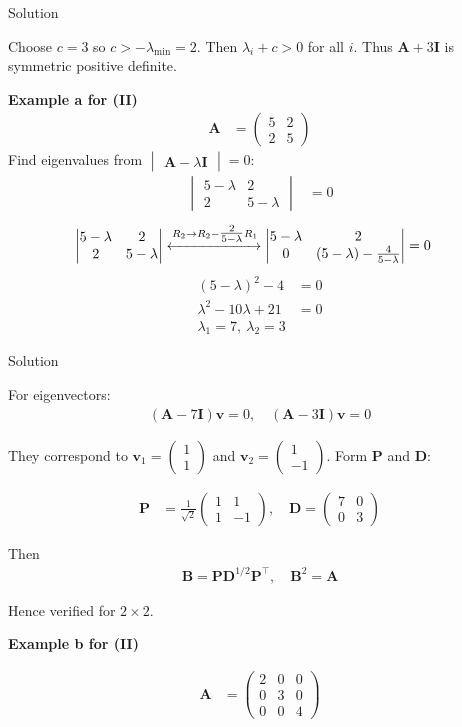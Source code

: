 \documentclass{beamer}
\numberwithin{equation}{section}
\theoremstyle{remark}
\newcommand{\myvec}[1]{\ensuremath{\begin{pmatrix}#1\end{pmatrix}}}
\newcommand{\mydet}[1]{\ensuremath{\begin{vmatrix}#1\end{vmatrix}}}
\let\vec\mathbf
\begin{document}
\begin{frame}{Solution}

Choose $c=3$ so $c>-\lambda_{\min}=2$.  
Then $\lambda_i+c>0$ for all $i$.  
Thus $\vec{A}+3\vec{I}$ is symmetric positive definite.

\textbf{Example a for (II)}
\begin{align}
\vec{A} &= \myvec{5 & 2\\2 & 5}
\end{align}
Find eigenvalues from $\mydet{\vec{A}-\lambda \vec{I}}=0$:
\begin{align}
\mydet{5-\lambda & 2\\2 & 5-\lambda} &= 0
\end{align}
\begin{align}
\mydet{5-\lambda & 2\\2 & 5-\lambda} 
\xleftrightarrow{R_2 \to R_2 - \tfrac{2}{5-\lambda}R_1}
\mydet{5-\lambda & 2\\0 & (5-\lambda)-\tfrac{4}{5-\lambda}} &= 0
\end{align}
\begin{align}
(5-\lambda)^2 - 4 &= 0\\
\lambda^2 - 10\lambda + 21 &= 0\\
\lambda_1 = 7,\ \lambda_2 = 3 
\end{align}

\end{frame}

\begin{frame}{Solution}

For eigenvectors:
\begin{align}
(\vec{A}-7\vec{I})\vec{v}=0,\quad(\vec{A}-3\vec{I})\vec{v}=0
\end{align}

They correspond to $\vec{v}_1=\myvec{1\\1}$ and $\vec{v}_2=\myvec{1\\-1}$.  
Form $\vec{P}$ and $\vec{D}$:

\begin{align}
\vec{P} &= \frac{1}{\sqrt{2}}\myvec{1 & 1\\1 & -1},\quad
\vec{D} = \myvec{7 & 0\\0 & 3}
\end{align}

Then
\begin{align}
\vec{B} = \vec{P}\vec{D}^{1/2}\vec{P}^\top,\quad
\vec{B}^2 = \vec{A}
\end{align}

Hence verified for $2\times2$.

\textbf{Example b for (II)}

\begin{align}
\vec{A} &= \myvec{2 & 0 & 0\\0 & 3 & 0\\0 & 0 & 4}
\end{align}

\end{frame}
\end{document}
